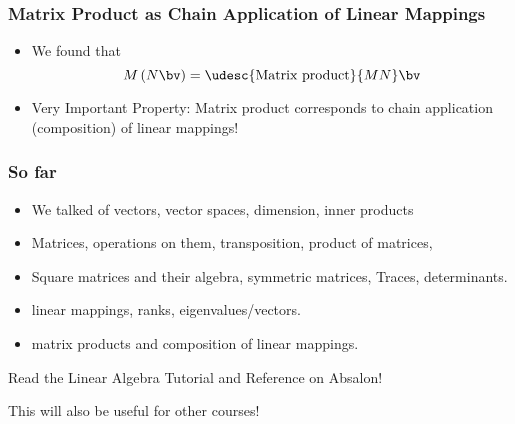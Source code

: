 \documentclass[8pt]{beamer}
\begin{document}
\begin{frame}
  \frametitle{Matrix Product as Chain Application of Linear Mappings}
  \begin{itemize}
  \item We found that 
    $$
    M\left (N\bv\right) = \udesc{\text{Matrix product}}{M N}\bv
    $$
  \item Very Important Property: Matrix product corresponds to chain application (composition) of linear mappings!
  \end{itemize}
\end{frame}

\begin{frame}
  \frametitle{So far}
  \begin{itemize}
  \item We talked of vectors, vector spaces, dimension, inner products
  \item Matrices, operations on them, transposition, product of matrices,
    \item Square matrices and their algebra, symmetric matrices, Traces, determinants.
    \item linear mappings, ranks, eigenvalues/vectors.
    \item matrix products and composition of linear mappings.
  \end{itemize}
\vfill
  \begin{center}
    \large
    Read the Linear Algebra Tutorial and Reference on Absalon!   
  \end{center}
  This will also be useful for other courses!
\end{frame}
\end{document}
